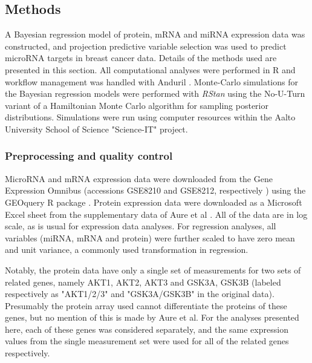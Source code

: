 





\subsection{Methods}

A Bayesian regression model of protein, mRNA and miRNA expression data was
constructed, and projection predictive variable selection was used to predict
microRNA targets in breast cancer data. Details of the methods used are
presented in this section. All computational analyses were performed in R
\citep{R} and workflow management was handled with Anduril \citep{Ovaska2010}.
Monte-Carlo simulations for the Bayesian regression models were performed with
\emph{RStan} \citep{RStan} using the No-U-Turn variant of a Hamiltonian Monte Carlo
algorithm for sampling posterior distributions. Simulations were run using
computer resources within the Aalto University School of Science "Science-IT"
project.


\subsubsection{Preprocessing and quality control}

MicroRNA and mRNA expression data were downloaded from the Gene Expression
Omnibus (accessions GSE8210 and GSE8212, respectively \citep{Edgar2002}) using
the GEOquery R package \citep{GEOquery}. Protein expression data were
downloaded as a Microsoft Excel sheet from the supplementary data of Aure et
al \citep{Aure2015}. All of the data are in log scale, as is usual for
expression data analyses. For regression analyses, all variables (miRNA, mRNA
and protein) were further scaled to have zero mean and unit variance,
a commonly used transformation in regression.

Notably, the protein data have only a single set of measurements for two sets
of related genes, namely AKT1, AKT2, AKT3 and GSK3A, GSK3B (labeled
respectively as "AKT1/2/3" and "GSK3A/GSK3B" in the original data). Presumably
the protein array used cannot differentiate the proteins of these genes, but
no mention of this is made by Aure et al. For the analyses presented here,
each of these genes was considered separately, and the same expression values
from the single measurement set were used for all of the related genes
respectively.

